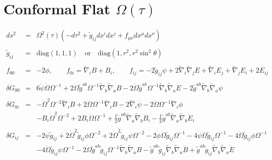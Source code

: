\documentclass[10pt,letterpaper]{article}
\numberwithin{equation}{section}
\begin{document}
\section{Conformal Flat $\Omega(\tau)$}
%
\begin{eqnarray}
ds^2 &=& \Omega^2(\tau)(-d\tau^2 + \tilde g_{ij} dx^i dx^j + f_{\mu\nu} dx^\mu dx^\nu)
\\ \nonumber\\
\tilde g_{ij} &=& \text{diag}(1,1,1)\quad\text{or}\quad \text{diag}(1,r^2,r^2\sin^2\theta)
\\ \nonumber\\
f_{00} &=& -2\phi,\qquad f_{0i}= \tilde \nabla_i B + B_i,\qquad 
f_{ij} = -2 \tilde g_{ij}\psi + 2\tilde\nabla_i\tilde \nabla_j E + \tilde \nabla_i E_j + \tilde \nabla_j E_i + 2E_{ij}
\\ \nonumber\\
\delta G_{00} &=& 6 \dot{\psi} \dot{\Omega} \Omega^{-1}
+ 2 \dot{\Omega} \tilde{g}^{ab} \Omega^{-1} \tilde{\nabla}_{b}\tilde{\nabla}_{a}B
- 2 \dot{\Omega} \tilde{g}^{ab} \Omega^{-1} \tilde{\nabla}_{b}\tilde{\nabla}_{a}\dot{E}
- 2 \tilde{g}^{ab} \tilde{\nabla}_{b}\tilde{\nabla}_{a}\psi
\\ \nonumber\\
\delta G_{0i} &=& 
- \dot{\Omega}^2 \Omega^{-2} \tilde{\nabla}_{i}B
+ 2 \ddot{\Omega} \Omega^{-1} \tilde{\nabla}_{i}B
- 2 \tilde{\nabla}_{i}\dot{\psi}
- 2 \dot{\Omega} \Omega^{-1} \tilde{\nabla}_{i}\phi
\nonumber\\
&&- B_{i} \dot{\Omega}^2 \Omega^{-2}
+ 2 B_{i} \ddot{\Omega} \Omega^{-1}
+ \tfrac{1}{2} \tilde{g}^{ab} \tilde{\nabla}_{a}\tilde{\nabla}_{b}B_{i}
-  \tfrac{1}{2} \tilde{g}^{ab} \tilde{\nabla}_{a}\tilde{\nabla}_{b}\dot{E}_{i}
\\ \nonumber\\
\delta G_{ij}&=&-2 \ddot{\psi} \tilde{g}_{ij}
+ 2 \dot{\Omega}^2 \tilde{g}_{ij} \phi \Omega^{-2}
+ 2 \dot{\Omega}^2 \tilde{g}_{ij} \psi \Omega^{-2}
- 2 \dot{\phi} \dot{\Omega} \tilde{g}_{ij} \Omega^{-1}
- 4 \dot{\psi} \dot{\Omega} \tilde{g}_{ij} \Omega^{-1}
- 4 \ddot{\Omega} \tilde{g}_{ij} \phi \Omega^{-1}\nonumber\\
&& - 4 \ddot{\Omega} \tilde{g}_{ij} \psi \Omega^{-1}
- 2 \dot{\Omega} \tilde{g}^{ab} \tilde{g}_{ij} \Omega^{-1} \tilde{\nabla}_{b}\tilde{\nabla}_{a}B
-  \tilde{g}^{ab} \tilde{g}_{ij} \tilde{\nabla}_{b}\tilde{\nabla}_{a}\dot{B}
+ \tilde{g}^{ab} \tilde{g}_{ij} \tilde{\nabla}_{b}\tilde{\nabla}_{a}\ddot{E}\nonumber\\

\end{eqnarray}
\end{document}
